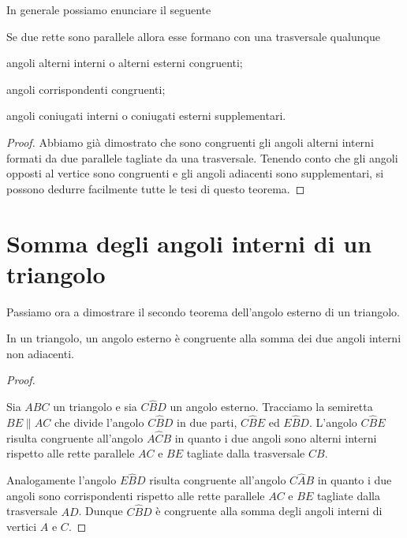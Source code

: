 In generale possiamo enunciare il seguente
\begin{teorema}
  Se due rette sono parallele allora esse formano con una trasversale 
  qualunque
  \begin{itemize*}
    \item angoli alterni interni o alterni esterni congruenti;
    \item angoli corrispondenti congruenti;
    \item angoli coniugati interni o coniugati esterni supplementari.
  \end{itemize*}
\end{teorema}

\begin{proof}
  Abbiamo già dimostrato che sono congruenti gli angoli alterni interni 
  formati da due parallele tagliate da una trasversale. Tenendo conto 
  che gli angoli opposti al vertice sono congruenti e gli angoli 
  adiacenti sono supplementari, si possono dedurre facilmente tutte le 
  tesi di questo teorema.
\end{proof}


\section{Somma degli angoli interni di un triangolo}
  \label{sect:angoli_interni_triangolo}

Passiamo ora a dimostrare il secondo teorema dell'angolo esterno di 
un triangolo.
\begin{teorema}
  In un triangolo, un angolo esterno è congruente alla somma dei due 
  angoli interni non adiacenti.
\end{teorema}

\begin{proof}
~

\begin{minipage}{.49\textwidth}
  Sia \(ABC\) un triangolo e sia \(C\widehat{B}D\) un angolo esterno. 
  Tracciamo la semiretta \(BE\parallel AC\) che divide l'angolo 
  \(C\widehat{B}D\) in due parti, \(C\widehat{B}E\) ed \(E\widehat{B}D\). 
  L'angolo \(C\widehat{B}E\) risulta congruente all'angolo 
  \(A\widehat{C}B\) in quanto i due angoli sono alterni interni rispetto 
  alle rette parallele \(AC\) e \(BE\) tagliate dalla trasversale \(CB\). 
\end{minipage}
\begin{minipage}{.49\textwidth}
\begin{inaccessibleblock}
    \begin{center}\end{center}
\end{inaccessibleblock}
\end{minipage}
  Analogamente l'angolo \(E\widehat{B}D\) risulta congruente all'angolo 
  \(C\widehat{A}B\) in quanto i due angoli sono corrispondenti rispetto 
  alle rette parallele \(AC\) e \(BE\) tagliate dalla trasversale \(AD\). 
  Dunque \(C\widehat{B}D\) è congruente alla somma degli angoli interni 
  di vertici \(A\) e \(C\).
\end{proof}

